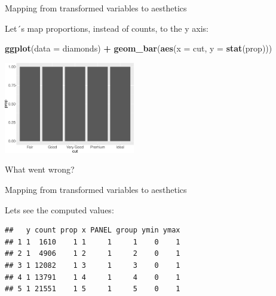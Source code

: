 \documentclass[ignorenonframetext,]{beamer}
\newenvironment{Shaded}{\begin{snugshade}}{\end{snugshade}}
\newcommand{\DataTypeTok}[1]{\textcolor[rgb]{0.13,0.29,0.53}{#1}}
\newcommand{\DecValTok}[1]{\textcolor[rgb]{0.00,0.00,0.81}{#1}}
\newcommand{\KeywordTok}[1]{\textcolor[rgb]{0.13,0.29,0.53}{\textbf{#1}}}
\newcommand{\NormalTok}[1]{#1}
\newcommand{\OperatorTok}[1]{\textcolor[rgb]{0.81,0.36,0.00}{\textbf{#1}}}
\newcommand{\StringTok}[1]{\textcolor[rgb]{0.31,0.60,0.02}{#1}}
\begin{document}
\begin{frame}[fragile]{Mapping from transformed variables to aesthetics}
\protect\hypertarget{mapping-from-transformed-variables-to-aesthetics-1}{}

Let´s map proportions, instead of counts, to the y axis:

\begin{Shaded}
\begin{Highlighting}[]
\KeywordTok{ggplot}\NormalTok{(}\DataTypeTok{data =}\NormalTok{ diamonds) }\OperatorTok{+}
\StringTok{  }\KeywordTok{geom_bar}\NormalTok{(}\KeywordTok{aes}\NormalTok{(}\DataTypeTok{x =}\NormalTok{ cut, }\DataTypeTok{y =} \KeywordTok{stat}\NormalTok{(prop)))}
\end{Highlighting}
\end{Shaded}

\begin{center}\includegraphics[height=150px]{data-visualization_files/figure-beamer/unnamed-chunk-119-1} \end{center}

What went wrong?

\end{frame}

\begin{frame}[fragile]{Mapping from transformed variables to aesthetics}
\protect\hypertarget{mapping-from-transformed-variables-to-aesthetics-2}{}

Lets see the computed values:

\begin{Shaded}
\end{Shaded}

\begin{verbatim}
##   y count prop x PANEL group ymin ymax
## 1 1  1610    1 1     1     1    0    1
## 2 1  4906    1 2     1     2    0    1
## 3 1 12082    1 3     1     3    0    1
## 4 1 13791    1 4     1     4    0    1
## 5 1 21551    1 5     1     5    0    1
\end{verbatim}

\end{frame}
\end{document}
